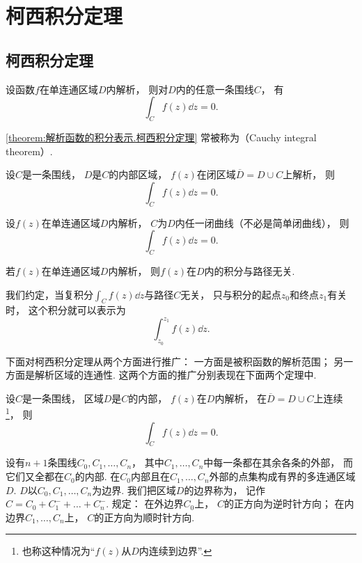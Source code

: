 \section{柯西积分定理}
\subsection{柯西积分定理}
\begin{theorem}\label{theorem:解析函数的积分表示.柯西积分定理}
设函数\(f\)在单连通区域\(D\)内解析，
则对\(D\)内的任意一条围线\(C\)，
有\[
	\int_C f(z) \dd{z} = 0.
\]
\end{theorem}
\cref{theorem:解析函数的积分表示.柯西积分定理}
常被称为（Cauchy integral theorem）.

\begin{theorem}\label{theorem:解析函数的积分表示.柯西积分定理.闭区域的情形}
设\(C\)是一条围线，
\(D\)是\(C\)的内部区域，
\(f(z)\)在闭区域\(\overline{D}=D \cup C\)上解析，
则\[
	\int_C f(z) \dd{z} = 0.
\]
\end{theorem}

\begin{corollary}\label{theorem:解析函数的积分表示.柯西积分定理.非简单闭曲线的情形}
设\(f(z)\)在单连通区域\(D\)内解析，
\(C\)为\(D\)内任一闭曲线（不必是简单闭曲线），
则\[
	\int_C f(z) \dd{z} = 0.
\]
\end{corollary}

\begin{corollary}\label{theorem:解析函数的积分表示.解析函数在解析区域内的积分与路径无关}
若\(f(z)\)在单连通区域\(D\)内解析，
则\(f(z)\)在\(D\)内的积分与路径无关.
\end{corollary}

我们约定，当复积分\(\int_C f(z) \dd{z}\)与路径\(C\)无关，
只与积分的起点\(z_0\)和终点\(z_1\)有关时，
这个积分就可以表示为\[
	\int_{z_0}^{z_1} f(z) \dd{z}.
\]

下面对柯西积分定理从两个方面进行推广：
一方面是被积函数的解析范围；
另一方面是解析区域的连通性.
这两个方面的推广分别表现在下面两个定理中.
\begin{theorem}
设\(C\)是一条围线，
区域\(D\)是\(C\)的内部，
\(f(z)\)在\(D\)内解析，
在\(\overline{D}=D \cup C\)上连续\footnote{也称这种情况为“\(f(z)\)从\(D\)内连续到边界”.}，
则\[
	\int_C f(z) \dd{z} = 0.
\]
\end{theorem}

\begin{definition}
设有\(n+1\)条围线\(C_0,C_1,\dots,C_n\)，
其中\(C_1,\dots,C_n\)中每一条都在其余各条的外部，
而它们又全都在\(C_0\)的内部.
在\(C_0\)内部且在\(C_1,\dots,C_n\)外部的点集构成有界的多连通区域\(D\).
\(D\)以\(C_0,C_1,\dots,C_n\)为边界.
我们把区域\(D\)的边界称为，
记作\(C=C_0+C_1^-+\dots+C_n^-\).
规定：
在外边界\(C_0\)上，
\(C\)的正方向为逆时针方向；
在内边界\(C_1,\dots,C_n\)上，
\(C\)的正方向为顺时针方向.
\end{definition}

